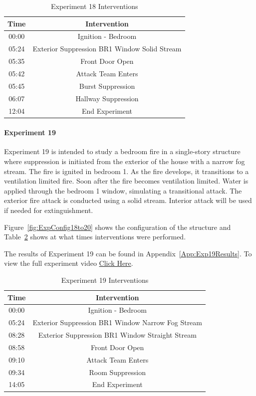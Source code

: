 \documentclass[12pt,oneside]{book}
\begin{document}
\begin{table}[H]
	\centering
	\caption{Experiment 18 Interventions}
	\begin{tabular}{|c|c|} 
		\hline
		Time & Intervention \\ \hline \hline
		00:00 & Ignition - Bedroom \\ \hline
		05:24 & Exterior Suppression BR1 Window Solid Stream \\ \hline
		05:35 & Front Door Open \\ \hline
		05:42 & Attack Team Enters\\ \hline
		05:45 & Burst Suppression \\ \hline 
		06:07 & Hallway Suppression \\ \hline
		12:04 & End Experiment\\ \hline
	\end{tabular}
	\label{Table:Exp18Interventions}
\end{table}

\clearpage

\paragraph{Experiment 19} \mbox{}

Experiment 19 is intended to study a bedroom fire in a single-story structure where suppression is initiated from the exterior of the house with a narrow fog stream. The fire is ignited in bedroom 1. As the fire develops, it transitions to a ventilation limited fire. Soon after the fire becomes ventilation limited. Water is applied through the bedroom 1 window, simulating a transitional attack. The exterior fire attack is conducted using a solid stream. Interior attack will be used if needed for extinguishment. 

Figure~\ref{fig:ExpConfig18to20} shows the configuration of the structure and Table~\ref{Table:Exp19Interventions} shows at what times interventions were performed. 

The results of Experiment 19 can be found in Appendix~\ref{App:Exp19Results}. To view the full experiment video \href{https://youtu.be/gl8rc1Nsl1k}{Click Here}.

\begin{table}[H]
	\centering
	\caption{Experiment 19 Interventions}
	\begin{tabular}{|c|c|} 
		\hline
		Time & Intervention \\ \hline \hline
		00:00 & Ignition - Bedroom \\ \hline
		05:24 & Exterior Suppression BR1 Window Narrow Fog Stream \\ \hline
		08:28 & Exterior Suppression BR1 Window Straight Stream \\ \hline
		08:58 & Front Door Open \\ \hline
		09:10 & Attack Team Enters\\ \hline
		09:34 & Room Suppression \\ \hline 
		14:05 & End Experiment\\ \hline
	\end{tabular}
	\label{Table:Exp19Interventions}
\end{table}
\end{document}
